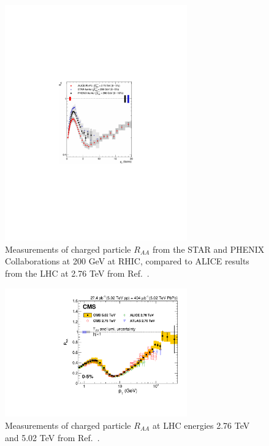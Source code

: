\begin{figure}[h!]
\begin{center}
\includegraphics[width=0.7\textwidth]{figures/Theory/ChPart_Raa_ALICE_RHIC.pdf}
\caption[Charged particle $R_{AA}$ at 200 GeV and 2.76 TeV]{Measurements of charged particle $R_{AA}$ from the STAR and PHENIX Collaborations at 200 GeV at RHIC, compared to ALICE results from the LHC at 2.76 TeV from Ref.~\cite{Aamodt:2010jd}.}
\label{fig:alice_chpart_raa}
\end{center}
\end{figure}

\begin{figure}[ht!]
\begin{center}
\includegraphics[width=0.7\textwidth]{figures/Theory/ChPart_Raa_CMS_LHC.pdf}
\caption[Charged particle $R_{AA}$ at 2.76 and 5.02 TeV]{Measurements of charged particle $R_{AA}$ at LHC energies 2.76 TeV and 5.02 TeV from Ref.~\cite{Khachatryan:2016odn}.}
\label{fig:cms_chpart_raa}
\end{center}
\end{figure}


